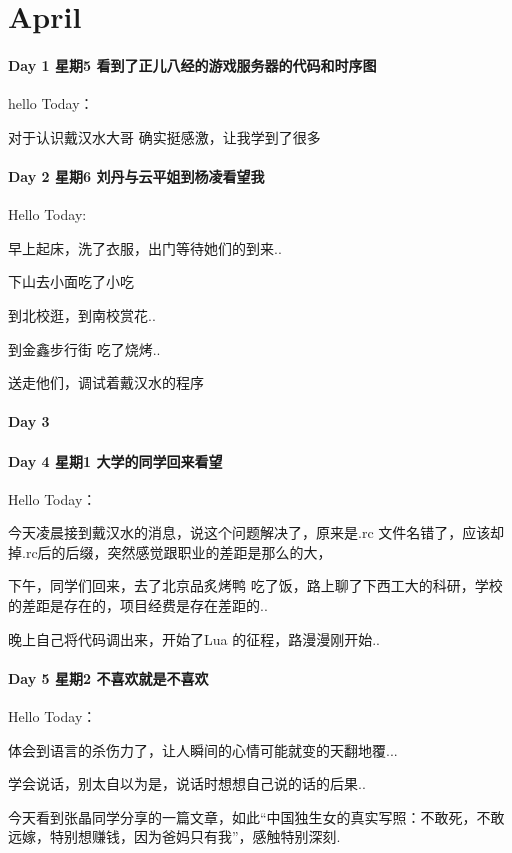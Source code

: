 \documentclass[UTF8,a4paper,8pt]{ctexbook}
\begin{document}
 \section*{April}
 	 \paragraph{Day 1   星期5    \quad   看到了正儿八经的游戏服务器的代码和时序图  }
	 	 hello Today：
	 	 
	 	 对于认识戴汉水大哥 确实挺感激，让我学到了很多
 	 \paragraph{Day 2   星期6    \quad    刘丹与云平姐到杨凌看望我 }
	 	 Hello Today:
	 	 
	 	 早上起床，洗了衣服，出门等待她们的到来..
	 	 
	 	 下山去小面吃了小吃
	 	 
	 	 到北校逛，到南校赏花..
	 	 
	 	 到金鑫步行街 吃了烧烤..
	 	 
	 	 送走他们，调试着戴汉水的程序
 	 \paragraph{Day 3       \quad     }
 	 \paragraph{Day 4   星期1    \quad   大学的同学回来看望  }
	 	 Hello Today：
	 	 
	 	 今天凌晨接到戴汉水的消息，说这个问题解决了，原来是.rc 文件名错了，应该却掉.rc后的后缀，突然感觉跟职业的差距是那么的大，
	 	 
	 	 下午，同学们回来，去了北京品炙烤鸭 吃了饭，路上聊了下西工大的科研，学校的差距是存在的，项目经费是存在差距的..\
	 	 
	 	 晚上自己将代码调出来，开始了Lua 的征程，路漫漫刚开始..
 	 \paragraph{Day 5   星期2    \quad    不喜欢就是不喜欢 }
	 	 Hello Today：
	 	 
	 	 体会到语言的杀伤力了，让人瞬间的心情可能就变的天翻地覆...
	 	 
	 	 学会说话，别太自以为是，说话时想想自己说的话的后果..
	 	 
	 	 今天看到张晶同学分享的一篇文章，如此“中国独生女的真实写照：不敢死，不敢远嫁，特别想赚钱，因为爸妈只有我”，感触特别深刻.
\end{document}
